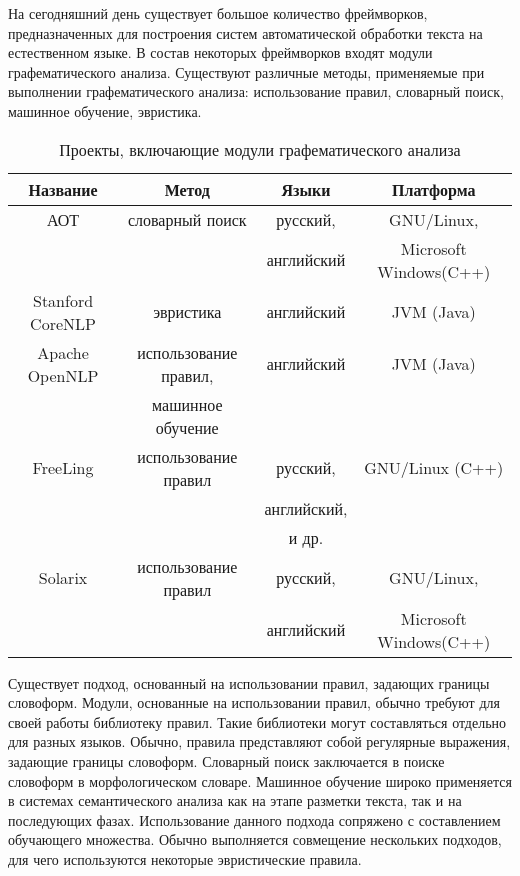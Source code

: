 На сегодняшний день существует большое количество фреймворков, предназначенных для построения систем автоматической обработки текста на естественном языке. В состав некоторых фреймворков входят модули графематического анализа. Существуют различные методы, применяемые при выполнении графематического анализа: использование правил, словарный поиск, машинное обучение, эвристика.
\begin{table}[H] \small
	\centering
	\label{t:thyp_gd1}
	\begin{tabular}{ | c | c | c | c |}
		\hline
		Название 							& Метод 				& Языки 		& Платформа 				\\ \hline
		АОТ\cite{web.aot}					& словарный поиск		& русский,		& GNU/Linux,			\\
											&						& английский	& Microsoft Windows(C++)\\ \hline
		Stanford CoreNLP\cite{web.corenlp}	& эвристика				& английский	& JVM (Java)			\\ \hline
		Apache OpenNLP\cite{web.opennlp}	& использование правил,	& английский	& JVM (Java)			\\
											& машинное обучение		& 				&						\\ \hline
		FreeLing\cite{web.freeling}			& использование правил	& русский,		& GNU/Linux (C++)		\\
											&						& английский,	&						\\
											&						& и др.			&						\\ \hline
		Solarix\cite{web.solarix}			& использование правил	& русский,		& GNU/Linux,			\\ 
											&						& английский	& Microsoft Windows(C++)\\
		\hline
	\end{tabular}
	\caption{Проекты, включающие модули графематического анализа}
\end{table}
Существует подход, основанный на использовании правил, задающих границы словоформ. Модули, основанные на использовании правил, обычно требуют для своей работы библиотеку правил. Такие библиотеки могут составляться отдельно для разных языков. Обычно, правила представляют собой регулярные выражения, задающие границы словоформ. Словарный поиск заключается в поиске словоформ в морфологическом словаре. Машинное обучение широко применяется в системах семантического анализа как на этапе разметки текста, так и на последующих фазах. Использование данного подхода сопряжено с составлением обучающего множества. Обычно выполняется совмещение нескольких подходов, для чего используются некоторые эвристические правила.

